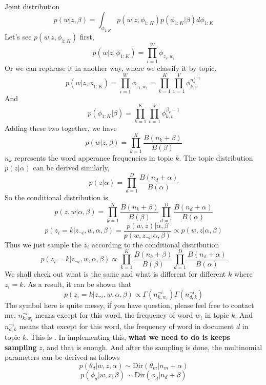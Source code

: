 \begin{frame}[allowframebreaks]{Joint distribution}
    $$p(w | z, \beta) = \int_{\phi_{1 : K}} p(w | z, \phi_{1 : K})p(\phi_{1 : K} | \beta)d \phi_{1 :K}$$
    Let's see $p(w | z, \phi_{1 : K})$ first, 
    $$p(w | z, \phi_{1 : K}) = \prod_{i=1}^W \phi_{z_i, w_i}$$
    Or we can rephrase it in another way, where we classify it by topic.
    $$p(w | z, \phi_{1 : K}) = \prod_{i=1}^W \phi_{z_i, w_i} = \prod_{k=1}^K \prod_{v=1}^V \phi_{k,v}^{n_k^{(v)}}$$
    And $$p(\phi_{1 : K} | \beta) = \prod_{k=1}^K \prod_{v=1}^V \phi_{k,v}^{\beta_v - 1} $$
    Adding these two together, we have
    $$p(w | z, \beta) = \prod_{k=1}^K \frac{B(n_k + \beta)}{B(\beta)}$$
    $n_k$ represents the word apperance frequencies in topic $k$.
    The topic distribution $p(z | \alpha)$ can be derived similarly,
    $$p(z | \alpha) = \prod_{d=1}^D\frac{B(n_d + \alpha)}{B(\alpha)}$$
    So the conditional distribution is
    $$p(z,w | \alpha, \beta) = \prod_{k=1}^K \frac{B(n_k + \beta)}{B(\beta)}\prod_{d=1}^D\frac{B(n_d + \alpha)}{B(\alpha)}$$
    $$p(z_i = k | z_{\neg i}, w, \alpha, \beta) = \frac{p(w,z) | \alpha, \beta}{p(w, z_{\neg i} | \alpha, \beta)} \propto p(w,z | \alpha, \beta) $$
    Thus we just sample the $z_i$ according to the conditional distribution
    $$p(z_i = k | z_{\neg i}, w, \alpha, \beta) \propto \prod_{k=1}^K \frac{B(n_k + \beta)}{B(\beta)}\prod_{d=1}^D\frac{B(n_d + \alpha)}{B(\alpha)}$$
    We shall check out what is the same and what is different for different $k$ where $z_i = k$. As a result, it can be shown that 
    $$p(z_i = k | z_{\neg i}, w, \alpha, \beta) \propto \Gamma(n_{k, w_i}^{\neg i}) \Gamma(n_{d, k}^{\neg i})$$
    The symbol here is quite messy, if you have question, please feel free to contact me. $n_{k, w_i}^{\neg i}$ means except for this word, the frequency of word $w_i$ in topic $k$. And $n_{d, k}^{\neg i}$ means that except for this word, the frequency of word in document $d$ in topic $k$.
    This is . In implementing this, \textbf{what we need to do is keeps sampling} $z$, and that is enough.
    And after the sampling is done, the multinomial parameters can be derived as follows
    $$p(\theta_d | w, z, \alpha) \sim \text{Dir}(\theta_m | n_m + \alpha)$$
    $$p(\phi_d | w, z, \beta) \sim \text{Dir}(\phi_d | n_d + \beta) $$
    \end{frame}
    
